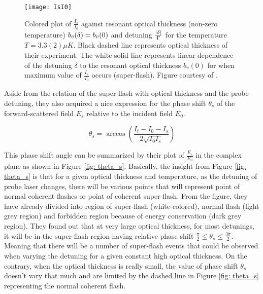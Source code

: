 \begin{figure}[h!]
    \centering
    \texttt{[image: IsI0]}
    \caption{Colored plot of $\frac{I_{s}}{I_{0}}$  against resonant optical thickness (non-zero temperature) $b_{\bar{v}}(\delta) = b_{\Bar{v}}(0)$ and detuning $\frac{\abs{\delta}}{\Gamma}$ for the temperature $T = 3.3(2) \mu K$. Black dashed line represents optical thickness of their experiment. The white solid line represents linear dependence of the detuning $\delta$ to the resonant optical thickness $b_{\bar{v}}(0)$ for when maximum value of $\frac{I_{s}}{I_{0}}$ occurs (super-flash). Figure courtesy of \cite{Kwong2014}.}
    \label{fig: I_s/I_0}
\end{figure}

\newpage

Aside from the relation of the super-flash with optical thickness and the probe detuning, they also acquired a nice expression for the phase shift $\theta_{s}$ of the forward-scattered field $E_{s}$ relative to the incident field $E_{0}$. 

\begin{equation}
    \theta_{s} = \arccos({\frac{I_{t} - I_{0} - I_{s}}{2 \sqrt{I_{0} I_{s}}}})
\end{equation}

This phase shift angle can be summarized by their plot of $\frac{E_{s}}{E_{0}}$ in the complex plane as shown in Figure \ref{fig: theta_s}. Basically, the insight from Figure \ref{fig: theta_s} is that for a given optical thickness and temperature, as the detuning of probe laser changes, there will be various points that will represent point of normal coherent flashes or point of coherent super-flash. From the figure, they have already divided into region of super-flash (white-colored), normal flash (light grey region) and forbidden region because of energy conservation (dark grey region). They found out that at very large optical thickness, for most detunings, it will be in the super-flash region having relative phase shift $\frac{\pi}{2} \leq \theta_{s} \leq \frac{3\pi}{2}$. Meaning that there will be a number of super-flash events that could be observed when varying the detuning for a given constant high optical thickness. On the contrary, when the optical thickness is really small, the value of phase shift $\theta_{s}$ doesn't vary that much and are limited by the dashed line in Figure \ref{fig: theta_s} representing the normal coherent flash.

